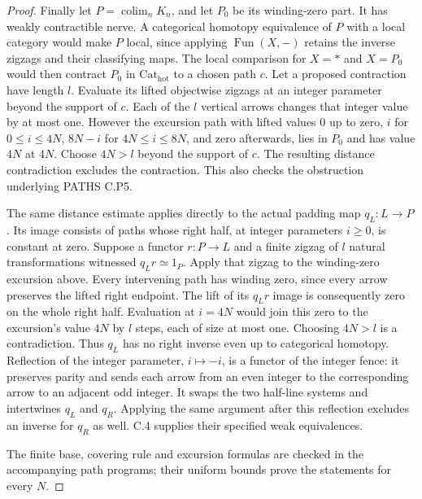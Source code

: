 \begin{proof}
Finally let $P=\operatorname{colim}_nK_n$, and let $P_0$ be
its winding-zero part. It has weakly contractible nerve. A
categorical homotopy equivalence of $P$ with a local category
would make $P$ local, since applying $\operatorname{Fun}(X,-)$
retains the inverse zigzags and their classifying maps. The
local comparison for $X=*$ and $X=P_0$ would then contract
$P_0$ in $\mathrm{Cat}_{\mathrm{hot}}$ to a chosen path $c$.
Let a proposed contraction have length $l$. Evaluate its lifted
objectwise zigzags at an integer parameter beyond the support of
$c$. Each of the $l$ vertical arrows changes that integer value
by at most one. However the excursion path with lifted values
$0$ up to zero, $i$ for $0\leq i\leq4N$, $8N-i$ for
$4N\leq i\leq8N$, and zero afterwards, lies in $P_0$ and has
value $4N$ at $4N$. Choose $4N>l$ beyond the support of $c$.
The resulting distance contradiction excludes the contraction.
This also checks the obstruction underlying PATHS C.P5.

The same distance estimate applies directly to the actual padding
map $q_L:L\to P$. Its image consists of paths whose right half,
at integer parameters $i\geq0$, is constant at zero. Suppose a
functor $r:P\to L$ and a finite zigzag of $l$ natural
transformations witnessed $q_Lr\simeq1_P$. Apply that zigzag to
the winding-zero excursion above. Every intervening path has
winding zero, since every arrow preserves the lifted right
endpoint. The lift of its $q_Lr$ image is consequently zero on
the whole right half. Evaluation at $i=4N$ would join this zero
to the excursion's value $4N$ by $l$ steps, each of size at most
one. Choosing $4N>l$ is a contradiction. Thus $q_L$ has no
right inverse even up to categorical homotopy. Reflection of the
integer parameter, $i\mapsto-i$, is a functor of the integer
fence: it preserves parity and sends each arrow from an even
integer to the corresponding arrow to an adjacent odd integer.
It swaps the two half-line systems and intertwines $q_L$ and
$q_R$. Applying the same argument after this reflection excludes
an inverse for $q_R$ as well. C.4 supplies their specified weak
equivalences.

The finite base, covering rule and excursion formulas are
checked in the accompanying path programs; their uniform bounds
prove the statements for every $N$.
\end{proof}
